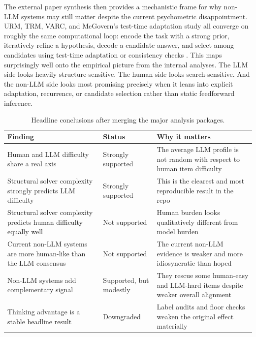 \documentclass[11pt,letterpaper]{article}
\begin{document}
The external paper synthesis then provides a mechanistic frame for why non-LLM systems may still matter despite the current psychometric disappointment. URM, TRM, VARC, and McGovern's test-time adaptation study all converge on roughly the same computational loop: encode the task with a strong prior, iteratively refine a hypothesis, decode a candidate answer, and select among candidates using test-time adaptation or consistency checks \cite{gao2025urm, hu2025varc, jolicoeur2025trm, mcgovern2025ttatrm}. This maps surprisingly well onto the empirical picture from the internal analyses. The LLM side looks heavily structure-sensitive. The human side looks search-sensitive. And the non-LLM side looks most promising precisely when it leans into explicit adaptation, recurrence, or candidate selection rather than static feedforward inference.

\begin{table}[t]
\centering
\small
\begin{tabularx}{\textwidth}{>{\raggedright\arraybackslash}p{4.0cm} >{\raggedright\arraybackslash}p{2.2cm} >{\raggedright\arraybackslash}X}
\toprule
Finding & Status & Why it matters \\
\midrule
Human and LLM difficulty share a real axis & Strongly supported & The average LLM profile is not random with respect to human item difficulty \\
Structural solver complexity strongly predicts LLM difficulty & Strongly supported & This is the clearest and most reproducible result in the repo \\
Structural solver complexity predicts human difficulty equally well & Not supported & Human burden looks qualitatively different from model burden \\
Current non-LLM systems are more human-like than the LLM consensus & Not supported & The current non-LLM evidence is weaker and more idiosyncratic than hoped \\
Non-LLM systems add complementary signal & Supported, but modestly & They rescue some human-easy and LLM-hard items despite weaker overall alignment \\
Thinking advantage is a stable headline result & Downgraded & Label audits and floor checks weaken the original effect materially \\
\bottomrule
\end{tabularx}
\caption{Headline conclusions after merging the major analysis packages.}
\label{tab:headline}
\end{table}
\end{document}
